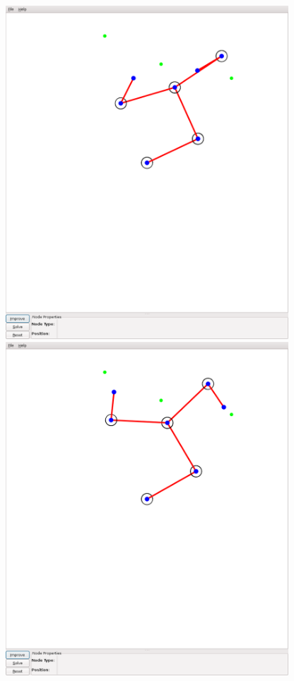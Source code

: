 \documentclass{article}
\begin{document}
\begin{center}
        \includegraphics[width=400px]{pose_3.png} \\
        \includegraphics[width=400px]{pose_4.png} \\

\end{center}
\end{document}

